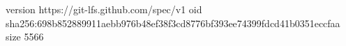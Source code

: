 version https://git-lfs.github.com/spec/v1
oid sha256:698b852889911aebb976b48ef38f3cd8776bf393ee74399fdcd41b0351eccfaa
size 5566
